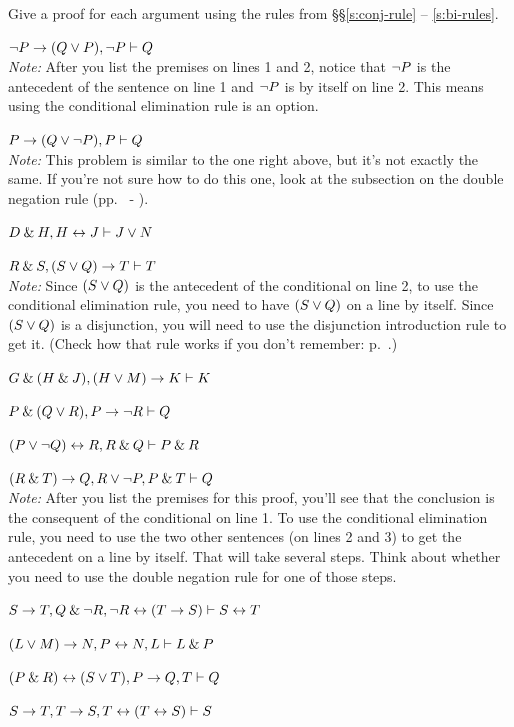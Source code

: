 \problempart\label{practice-proofs-1}
Give a proof for each argument using the rules from \S\S \ref{s:conj-rule} -- \ref{s:bi-rules}.
\begin{earg}
\item ${\neg} P \rightarrow (Q \vee P), {\neg} P \vdash Q$\\
\textit{Note:} After you list the premises on lines 1 and 2, notice that ${\neg} P$ is the antecedent of the sentence on line 1 and ${\neg} P$ is by itself on line 2. This means using the conditional elimination rule is an option.
\medskip
\item $P \rightarrow (Q \vee {\neg} P), P \vdash Q$\\
\textit{Note:} This problem is similar to the one right above, but it's not exactly the same. If you're not sure how to do this one, look at the subsection on the double negation rule (pp.~\pageref{subsection-DN} - \pageref{DN-box}).
\medskip
\item $D \mathbin{\&} H, H \leftrightarrow J  \vdash J \vee N$\smallskip 

\item $R \mathbin{\&} S, (S \vee Q) \rightarrow T \vdash T$\\
\textit{Note:} Since $(S \vee Q)$ is the antecedent of the conditional on line 2, to use the conditional elimination rule, you need to have $(S \vee Q)$ on a line by itself. Since $(S \vee Q)$ is a disjunction, you will need to use the disjunction introduction rule to get it. (Check how that rule works if you don't remember: p.~\pageref{di-rule-box}.)
\medskip

\item $G \mathbin{\&} (H \mathbin{\&} J), (H \vee M) \rightarrow K \vdash K$\smallskip
\item $P \mathbin{\&} (Q \vee R), P \rightarrow {\neg} R \vdash Q$\smallskip
\item $(P \vee {\neg} Q) \leftrightarrow R, R \mathbin{\&} Q \vdash P \mathbin{\&} R$\smallskip
\item $(R \mathbin{\&} T) \rightarrow Q, R \vee {\neg} P, P \mathbin{\&} T \vdash Q$\\
\textit{Note:} After you list the premises for this proof, you'll see that the conclusion is the consequent of the conditional on line 1. To use the conditional elimination rule, you need to use the two other sentences (on lines 2 and 3) to get the antecedent on a line by itself. That will take several steps. Think about whether you need to use the double negation rule for one of those steps. 
\medskip

\item $S \rightarrow T, Q \mathbin{\&} {\neg} R, {\neg} R \leftrightarrow (T \rightarrow S) \vdash S \leftrightarrow T $\smallskip
\item $(L \vee M) \rightarrow N, P \leftrightarrow N, L \vdash L \mathbin{\&} P$\smallskip
\item $(P \mathbin{\&} R) \leftrightarrow (S \vee T), P \rightarrow Q, T \vdash Q$\smallskip
\item $S \rightarrow T, T \rightarrow S, T \leftrightarrow (T \leftrightarrow S) \vdash S$\smallskip
\end{earg}


